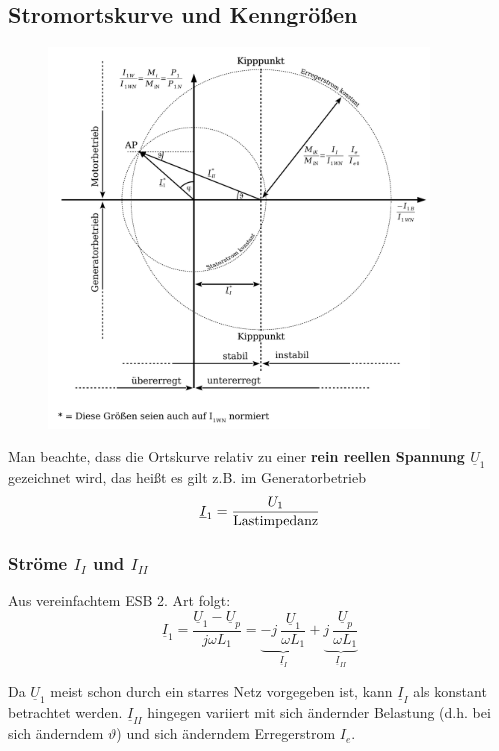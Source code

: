 \documentclass[a4paper, 11pt]{article}
\begin{document}
\subsection*{Stromortskurve und Kenngrößen}
\begin{figure}[H]
	\centering
	\includegraphics[width=0.9\textwidth]{img/synchronmaschine_ortskurve.pdf}
\end{figure}

Man beachte, dass die Ortskurve relativ zu einer \textbf{rein reellen Spannung $\underline U_1$} gezeichnet wird, das heißt es gilt z.B. im Generatorbetrieb
\[
	\underline I_1 = \frac{U_1}{\textnormal{Lastimpedanz}}
\]

\subsubsection*{Ströme $I_I$ und $I_{II}$}
Aus vereinfachtem ESB 2. Art folgt:
\[
	\underline I_1 = \frac{\underline U_1 - \underline U_p}{j\omega L_1} = \underbrace{-j ~ \frac{\underline U_1}{\omega L_1}}_{\underline I_I} + \underbrace{j ~ \frac{\underline U_p}{\omega L_1}}_{\underline I_{II}}
\]

Da $\underline U_1$ meist schon durch ein starres Netz vorgegeben ist, kann $\underline I_I$ als konstant betrachtet werden. $\underline I_{II}$ hingegen variiert mit sich ändernder Belastung (d.h. bei sich änderndem $\vartheta$) und sich änderndem Erregerstrom $I_e$.
\end{document}
